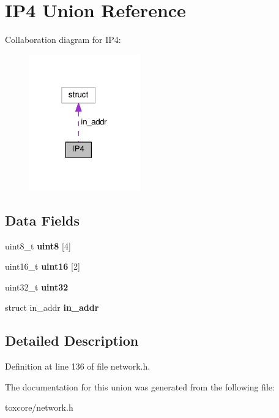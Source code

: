 \hypertarget{union_i_p4}{\section{I\+P4 Union Reference}
\label{union_i_p4}
}


Collaboration diagram for I\+P4\+:
\nopagebreak
\begin{figure}[H]
\begin{center}
\leavevmode
\includegraphics[width=136pt]{union_i_p4__coll__graph}
\end{center}
\end{figure}
\subsection*{Data Fields}
\begin{DoxyCompactItemize}
\item 
\hypertarget{union_i_p4_a73b9a57544f1edd6e2187aca636c75ef}{uint8\+\_\+t {\bfseries uint8} \mbox{[}4\mbox{]}}\label{union_i_p4_a73b9a57544f1edd6e2187aca636c75ef}

\item 
\hypertarget{union_i_p4_ac29b55876c4db8c2e69e138039fb7a8a}{uint16\+\_\+t {\bfseries uint16} \mbox{[}2\mbox{]}}\label{union_i_p4_ac29b55876c4db8c2e69e138039fb7a8a}

\item 
\hypertarget{union_i_p4_a5ad776be1fb768f3399aafcd1b58b3a2}{uint32\+\_\+t {\bfseries uint32}}\label{union_i_p4_a5ad776be1fb768f3399aafcd1b58b3a2}

\item 
\hypertarget{union_i_p4_a5a47f63dce37e6eb6be40f022434b1c5}{struct in\+\_\+addr {\bfseries in\+\_\+addr}}\label{union_i_p4_a5a47f63dce37e6eb6be40f022434b1c5}

\end{DoxyCompactItemize}


\subsection{Detailed Description}


Definition at line 136 of file network.\+h.



The documentation for this union was generated from the following file\+:\begin{DoxyCompactItemize}
\item 
toxcore/network.\+h\end{DoxyCompactItemize}
